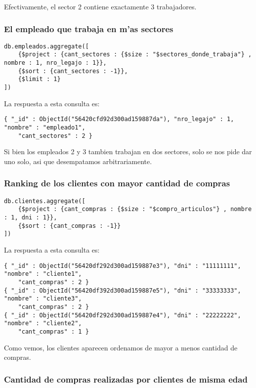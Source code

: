 Efectivamente, el sector 2 contiene exactamente 3 trabajadores.


\subsubsection{El empleado que trabaja en m'as sectores}

\begin{verbatim}
db.empleados.aggregate([
    {$project : {cant_sectores : {$size : "$sectores_donde_trabaja"} , nombre : 1, nro_legajo : 1}},
    {$sort : {cant_sectores : -1}},
    {$limit : 1}
])
\end{verbatim}

La respuesta a esta consulta es:

\begin{verbatim}
{ "_id" : ObjectId("56420cfd92d300ad159887da"), "nro_legajo" : 1, "nombre" : "empleado1",
    "cant_sectores" : 2 }
\end{verbatim}

Si bien los empleados 2 y 3 tambien trabajan en dos sectores, solo se nos pide dar uno solo, asi que desempatamos arbitrariamente.

\subsubsection{Ranking de los clientes con mayor cantidad de compras}

\begin{verbatim}
db.clientes.aggregate([
    {$project : {cant_compras : {$size : "$compro_articulos"} , nombre : 1, dni : 1}},
    {$sort : {cant_compras : -1}}
])
\end{verbatim}

La respuesta a esta consulta es:

\begin{verbatim}
{ "_id" : ObjectId("56420df292d300ad159887e3"), "dni" : "11111111", "nombre" : "cliente1",
    "cant_compras" : 2 }
{ "_id" : ObjectId("56420df392d300ad159887e5"), "dni" : "33333333", "nombre" : "cliente3",
    "cant_compras" : 2 }
{ "_id" : ObjectId("56420df292d300ad159887e4"), "dni" : "22222222", "nombre" : "cliente2",
    "cant_compras" : 1 }
\end{verbatim}

Como vemos, los clientes aparecen ordenamos de mayor a menos cantidad de compras.

\subsubsection{Cantidad de compras realizadas por clientes de misma edad}

